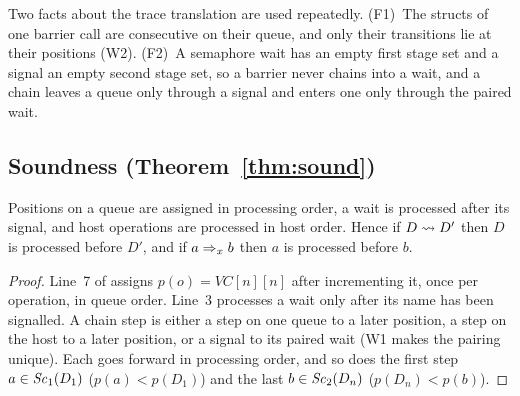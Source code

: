Two facts about the trace translation are used repeatedly. (F1)~The structs of one barrier call are consecutive on
their queue, and only their transitions lie at their positions (W2). (F2)~A semaphore wait has an empty first stage set
and a signal an empty second stage set, so a barrier never chains into a wait, and a chain leaves a queue only through
a signal and enters one only through the paired wait.

\subsection{Soundness (Theorem~\ref{thm:sound})}
\label{app:sound}

\begin{lemma}[Linearization]\label{lem:lin}
Positions on a queue are assigned in processing order, a wait is processed after its signal, and host operations are
processed in host order. Hence if $D \rightsquigarrow D'$ then $D$ is processed before $D'$, and if $a \Rightarrow_{x} b$ then $a$ is
processed before $b$.
\end{lemma}
\begin{proof}
Line~7 of  assigns $p(o) = \mathit{VC}[n][n]$ after incrementing it, once per operation, in queue order.
Line~3 processes a wait only after its name has been signalled. A chain step is either a step on one queue to a later
position, a step on the host to a later position, or a signal to its paired wait (W1 makes the pairing unique).
Each goes forward in processing order, and so does the first step $a \in \mathit{Sc}_{1}(D_1)$ ($p(a) < p(D_1)$) and the last
$b \in \mathit{Sc}_{2}(D_n)$ ($p(D_n) < p(b)$).
\end{proof}

